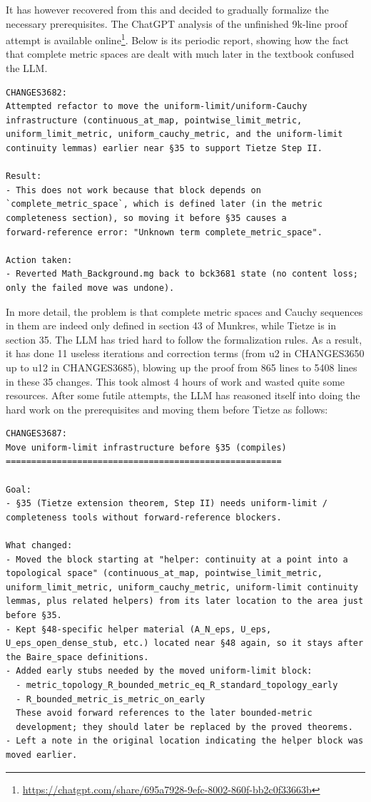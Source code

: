\documentclass[a4paper,UKenglish,cleveref, autoref, thm-restate]{lipics-v2021}
\begin{document}
It has however recovered from this and decided to gradually formalize the necessary prerequisites.
The ChatGPT analysis of the unfinished 9k-line proof attempt is available online\footnote{\url{https://chatgpt.com/share/695a7928-9efc-8002-860f-bb2c0f33663b}}. Below is its periodic report, showing how the fact that complete metric spaces are dealt with much later in the textbook confused the LLM.
%
%
%
%
%
%
\begin{small}
\begin{verbatim}
CHANGES3682:
Attempted refactor to move the uniform-limit/uniform-Cauchy
infrastructure (continuous_at_map, pointwise_limit_metric,
uniform_limit_metric, uniform_cauchy_metric, and the uniform-limit
continuity lemmas) earlier near §35 to support Tietze Step II.

Result:
- This does not work because that block depends on
`complete_metric_space`, which is defined later (in the metric
completeness section), so moving it before §35 causes a
forward-reference error: "Unknown term complete_metric_space".

Action taken:
- Reverted Math_Background.mg back to bck3681 state (no content loss;
only the failed move was undone).
\end{verbatim}
\end{small}
In more detail, the problem is that complete metric spaces and Cauchy sequences in them are indeed only defined in section 43 of Munkres, while Tietze is in section 35. The LLM has tried hard to follow the formalization rules. 
As a result, it has done 11 useless iterations and correction terms (from u2 in CHANGES3650 up to u12 in CHANGES3685), blowing up the proof from 865 lines to 5408 lines in these 35 changes. This took almost 4 hours of work and wasted quite some resources.
%
%
%
%
%
%
After some futile attempts, the LLM has reasoned itself into doing the hard work on the prerequisites and moving them before Tietze as follows:
\begin{small}
\begin{verbatim}
CHANGES3687:
Move uniform-limit infrastructure before §35 (compiles)
======================================================

Goal:
- §35 (Tietze extension theorem, Step II) needs uniform-limit /
completeness tools without forward-reference blockers.

What changed:
- Moved the block starting at "helper: continuity at a point into a
topological space" (continuous_at_map, pointwise_limit_metric,
uniform_limit_metric, uniform_cauchy_metric, uniform-limit continuity
lemmas, plus related helpers) from its later location to the area just
before §35.
- Kept §48-specific helper material (A_N_eps, U_eps,
U_eps_open_dense_stub, etc.) located near §48 again, so it stays after
the Baire_space definitions.
- Added early stubs needed by the moved uniform-limit block:
  - metric_topology_R_bounded_metric_eq_R_standard_topology_early
  - R_bounded_metric_is_metric_on_early
  These avoid forward references to the later bounded-metric
  development; they should later be replaced by the proved theorems.
- Left a note in the original location indicating the helper block was moved earlier.
\end{verbatim}
\end{small}
\end{document}
